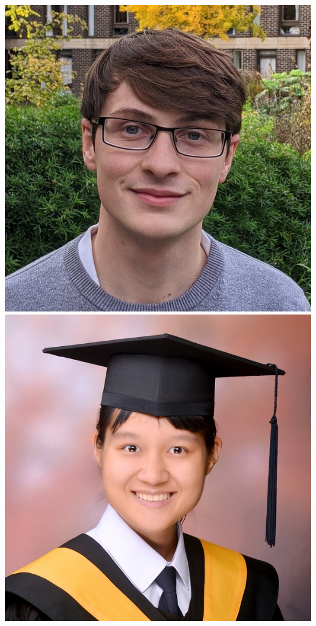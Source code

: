\documentclass[aspectratio=169]{beamer}
\begin{document}
\begin{frame}
{            \includegraphics[width=0.1\textheight]{figures/students/thomas_gessey-jones.jpg}%
            \includegraphics[width=0.1\textheight]{figures/students/wei-ning_deng.jpg}%
}
\end{frame}
\end{document}
